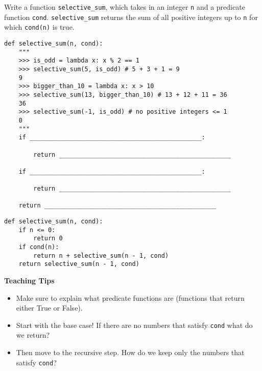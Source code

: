 \begin{blocksection}
    \question Write a function \lstinline{selective_sum}, which takes in an integer \lstinline{n} and a predicate function \lstinline{cond}. \lstinline{selective_sum} returns the sum of all positive integers up to \lstinline{n} for which \lstinline{cond(n)} is true. 
    
    \begin{lstlisting}
def selective_sum(n, cond):
    """
    >>> is_odd = lambda x: x % 2 == 1
    >>> selective_sum(5, is_odd) # 5 + 3 + 1 = 9
    9
    >>> bigger_than_10 = lambda x: x > 10
    >>> selective_sum(13, bigger_than_10) # 13 + 12 + 11 = 36
    36
    >>> selective_sum(-1, is_odd) # no positive integers <= 1
    0
    """
    if _______________________________________________:

        return _______________________________________________

    if _______________________________________________:

        return _______________________________________________

    return _______________________________________________
    \end{lstlisting}

    \begin{solution}[0.5in]
    \begin{lstlisting}
def selective_sum(n, cond):
    if n <= 0:
        return 0
    if cond(n):
        return n + selective_sum(n - 1, cond)
    return selective_sum(n - 1, cond)
    \end{lstlisting}
    \end{solution}
    \begin{questionmeta}
        \textbf{Teaching Tips}
        \begin{itemize}
            \item Make sure to explain what predicate functions are (functions that return either True or False).
            \item Start with the base case! If there are no numbers that satisfy \lstinline{cond} what do we return?
            \item Then move to the recursive step. How do we keep only the numbers that satisfy \lstinline{cond}?
        \end{itemize}
      \end{questionmeta}

    \end{blocksection}
    